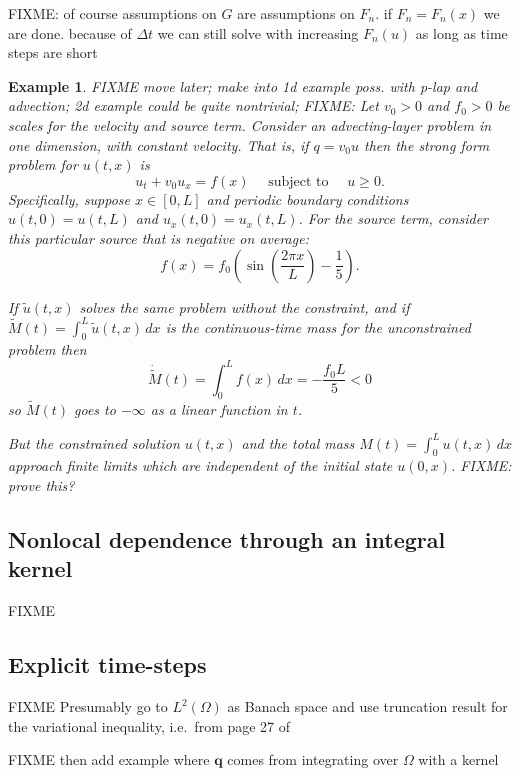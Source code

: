 \documentclass[final,leqno,onefignum,onetabnum]{siamltex1213bueler}
\newtheorem{example}{Example}
\newcommand\bq{\mathbf{q}}
\begin{document}
FIXME: of course assumptions on $G$ are assumptions on $F_n$.  if $F_n=F_n(x)$ we are done. because of $\Delta t$ we can still solve with increasing $F_n(u)$ as long as time steps are short



\begin{example}  FIXME move later; make into 1d example poss. with p-lap and advection; 2d example could be quite nontrivial; FIXME: Let $v_0>0$ and $f_0>0$ be scales for the velocity and source term.  Consider an advecting-layer problem in one dimension, with constant velocity.  That is, if $q = v_0 u$ then the strong form problem for $u(t,x)$ is
\begin{equation}
u_t + v_0 u_x = f(x) \quad \text{ subject to } \quad u\ge 0.  \label{eq:ex:advectlayer}
\end{equation}
Specifically, suppose $x\in[0,L]$ and periodic boundary conditions $u(t,0)=u(t,L)$ and $u_x(t,0)=u_x(t,L)$.  For the source term, consider this particular source that is negative on average:
    $$f(x) = f_0 \left(\sin\left(\frac{2\pi x}{L}\right) - \frac{1}{5}\right).$$

If $\tilde u(t,x)$ solves the same problem without the constraint, and if $\tilde M(t) = \int_0^L \tilde u(t,x)\,dx$ is the continuous-time mass for the unconstrained problem then
    $$\dot{\tilde M}(t) = \int_0^L f(x)\,dx = -\frac{f_0 L}{5} < 0$$
so $\tilde M(t)$ goes to $-\infty$ as a linear function in $t$.

But the constrained solution $u(t,x)$ and the total mass $M(t) = \int_0^L u(t,x)\,dx$ approach finite limits which are independent of the initial state $u(0,x)$.  FIXME: prove this?
\end{example}

\subsection{Nonlocal dependence through an integral kernel} \label{subsec:nonlocal} FIXME  

\subsection{Explicit time-steps} \label{subsec:explicit}  FIXME  Presumably go to $L^2(\Omega)$ as Banach space and use truncation result for the variational inequality, i.e.~from page 27 of \cite{KinderlehrerStampacchia}

FIXME then add example where $\bq$ comes from integrating over $\Omega$ with a kernel
\end{document}
